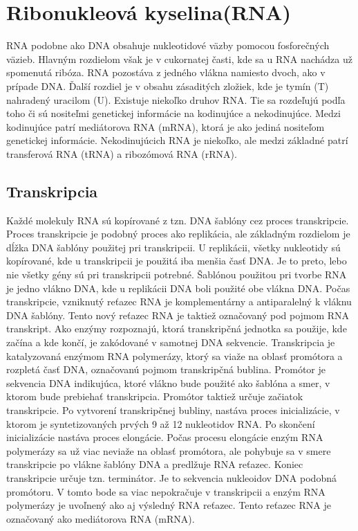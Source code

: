 \section{Ribonukleová kyselina(RNA)}
RNA podobne ako DNA obsahuje nukleotidové väzby pomocou fosforečných väzieb. Hlavným rozdielom však je v cukornatej časti, kde sa u RNA nachádza už spomenutá ribóza. RNA pozostáva z jedného vlákna namiesto dvoch, ako v prípade DNA. Ďalší rozdiel je v obsahu zásaditých zložiek, kde je tymín (T) nahradený uracilom (U). Existuje niekoľko druhov RNA. Tie sa rozdeľujú podľa toho či sú nositeľmi genetickej informácie na kodinujúce a nekodinujúce. Medzi kodinujúce patrí mediátorova RNA (mRNA), ktorá je ako jediná nositeľom genetickej informácie. Nekodinujúcich RNA je niekoľko, ale medzi základné patrí transferová RNA (tRNA) a ribozómová RNA (rRNA). 

\subsection{Transkripcia}
Každé molekuly RNA sú kopírované z tzn. DNA šablóny cez proces transkripcie. Proces transkripcie je podobný proces ako replikácia, ale základným rozdielom je dĺžka DNA šablóny použitej pri transkripcii. U replikácii, všetky nukleotidy sú kopírované, kde u transkripcii je použitá iba menšia časť DNA. Je to preto, lebo nie všetky gény sú pri transkripcii potrebné. Šablónou použitou pri tvorbe RNA je jedno vlákno DNA, kde u replikácii DNA boli použité obe vlákna DNA. Počas transkripcie, vzniknutý reťazec RNA je komplementárny a antiparalelný k vláknu DNA šablóny. Tento nový reťazec RNA je taktiež označovaný pod pojmom RNA transkript. Ako enzýmy rozpoznajú, ktorá transkripčná jednotka sa použije, kde začína a kde končí, je zakódované v samotnej DNA sekvencie. Transkripcia je katalyzovaná enzýmom RNA polymerázy, ktorý sa viaže na oblasť promótora a rozpletá časť DNA, označovanú pojmom transkripčná bublina. Promótor je sekvencia DNA indikujúca, ktoré vlákno bude použité ako šablóna a smer, v ktorom bude prebiehať transkripcia. Promótor taktiež určuje začiatok transkripcie. Po vytvorení transkripčnej bubliny, nastáva proces inicializácie, v ktorom je syntetizovaných prvých 9 až 12 nukleotidov RNA. Po skončení inicializácie nastáva proces elongácie. Počas procesu elongácie enzým RNA polymerázy sa už viac neviaže na oblasť promótora, ale pohybuje sa v smere transkripcie po vlákne šablóny DNA a predlžuje RNA reťazec. Koniec transkripcie určuje tzn. terminátor. Je to sekvencia nukleoidov DNA podobná promótoru. V tomto bode sa viac nepokračuje v transkripcii a enzým RNA polymerázy je uvoľnený ako aj výsledný RNA reťazec. Tento reťazec RNA je označovaný ako mediátorova RNA (mRNA). 

